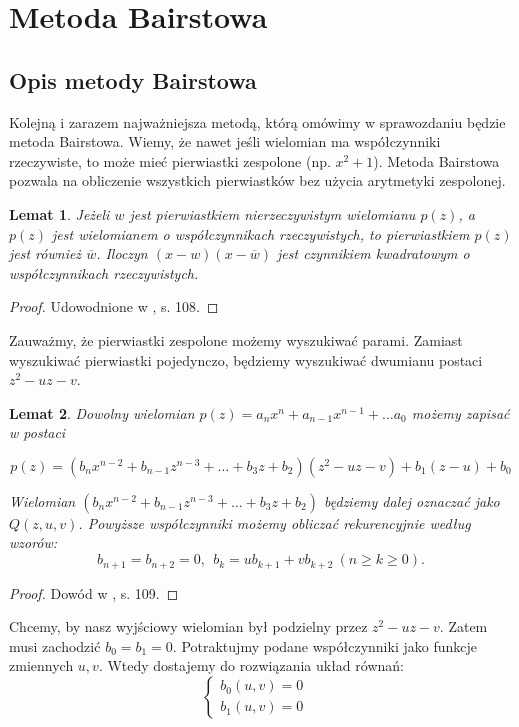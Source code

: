 \documentclass{article}
\newtheorem{lemat}{Lemat}
\begin{document}
\section{Metoda Bairstowa}

\subsection{Opis metody Bairstowa}

Kolejną i zarazem najważniejsza metodą, którą omówimy w sprawozdaniu będzie metoda Bairstowa. Wiemy, że nawet jeśli wielomian ma współczynniki rzeczywiste, to może mieć pierwiastki zespolone (np. $x^2 + 1$). Metoda Bairstowa pozwala na obliczenie wszystkich pierwiastków bez użycia arytmetyki zespolonej.


\begin{lemat}
Jeżeli $w$ jest pierwiastkiem nierzeczywistym wielomianu $p(z)$, a $p(z)$ jest wielomianem o współczynnikach rzeczywistych, to pierwiastkiem $p(z)$ jest również $\overline{w}$. Iloczyn $(x-w)(x-\overline{w})$ jest czynnikiem kwadratowym o współczynnikach rzeczywistych.
\end{lemat}

\begin{proof}
Udowodnione w \cite{kincaid}, s. 108.	
\end{proof}

Zauważmy, że pierwiastki zespolone możemy wyszukiwać parami. Zamiast wyszukiwać pierwiastki pojedynczo, będziemy wyszukiwać dwumianu postaci $z^2 - uz - v$.

\begin{lemat}
Dowolny wielomian $p(z) = a_nx^n  + a_{n-1}x^{n-1} + \ldots a_0$ możemy zapisać w postaci 

$$p(z) = \left(b_nx^{n-2} + b_{n-1}z^{n-3} + \ldots + b_3 z + b_2 \right) \left( z^2 - uz - v \right) + b_1(z-u) + b_0 $$	

Wielomian $ \left(b_nx^{n-2} + b_{n-1}z^{n-3} + \ldots + b_3 z + b_2 \right) $ będziemy dalej oznaczać jako $Q(z, u, v)$.
Powyższe współczynniki możemy obliczać rekurencyjnie według wzorów:
$$b_{n+1} = b_{n+2} = 0, \ \ b_k = ub_{k+1} + vb_{k+2} \ (n \geq k \geq 0).$$

\end{lemat}

\begin{proof}
Dowód w \cite{kincaid}, s. 109.	
\end{proof}

Chcemy, by nasz wyjściowy wielomian był podzielny przez $z^2 - uz - v$. Zatem musi zachodzić $b_0 = b_1 = 0$. Potraktujmy podane współczynniki jako funkcje zmiennych $u,v$. Wtedy dostajemy do rozwiązania układ równań:
$$
\left\{\begin{matrix}
b_0(u,v) = 0 & \\ 
b_1(u,v) = 0 & 
\end{matrix}\right.
$$
\end{document}
